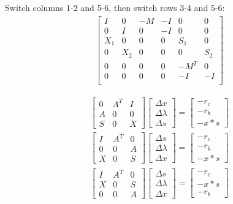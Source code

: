 \documentclass{article}
\begin{document}
Switch columns 1-2 and 5-6, then switch rows 3-4 and 5-6:
\begin{align}
		\begin{bmatrix}
				I	&	0	&	-M	&	-I	&	0	&	0\\
				0	&	I	&	0	&	-I	&	0	&	0\\
				X_1	&	0	&	0	&	0	&	S_1	&	0\\
				0	&	X_2	&	0	&	0	&	0	&	S_2\\
				0	&	0	&	0	&	0	& -M^T	&	0\\
				0	&	0	&	0	&	0	&	-I	&	-I\\
		\end{bmatrix}
\end{align}

\begin{align}
		\begin{bmatrix}
				0 & A^T & I\\
				A & 0   & 0\\
				S & 0   & X
		\end{bmatrix}
		\begin{bmatrix}
				\Delta x\\
				\Delta \lambda\\
				\Delta s
		\end{bmatrix} 
		= 
		\begin{bmatrix}
				-r_c\\
				-r_b\\
				-x*s
		\end{bmatrix}\\
		\begin{bmatrix}
				I & A^T & 0\\
				0 & 0   & A\\
				X & 0   & S
		\end{bmatrix}
		\begin{bmatrix}
				\Delta s\\
				\Delta \lambda\\
				\Delta x
		\end{bmatrix}
		= \begin{bmatrix}
				-r_c\\
				-r_b\\
				-x*s
		\end{bmatrix}\\
		\begin{bmatrix}
				I & A^T & 0\\
				X & 0   & S\\
				0 & 0   & A
		\end{bmatrix}
		\begin{bmatrix}
				\Delta s\\
				\Delta \lambda\\
				\Delta x
		\end{bmatrix}
		= 
		\begin{bmatrix}
				-r_c\\
				-x*s\\
				-r_b
		\end{bmatrix}
\end{align}
\end{document}
